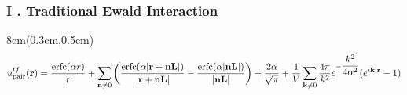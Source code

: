 \documentclass{beamer}
\begin{document}
	\begin{frame}
		\frametitle{I . Traditional Ewald Interaction }
		\footnotesize 
		
		\begin{textblock*}{8cm}(0.3cm,0.5cm)  
			\begin{equation*}
				u_{\text{pair}}^{tf}(\mathbf{r}) = \dfrac{\mathrm{erfc}(\alpha r)}{r} + \sum_{\mathbf{n}\ne 0} \bigg{(}\dfrac{\mathrm{erfc}(  \alpha|\mathbf{r}+\mathbf{n}\mathbf{L}|)}{|\mathbf{r}+\mathbf{n}\mathbf{L}|} - \dfrac{\mathrm{erfc}(  \alpha|\mathbf{n}\mathbf{L}|)}{|\mathbf{n}\mathbf{L}|}\bigg{)} + \dfrac{2\alpha}{\sqrt{\pi}} 
				+\dfrac{1}{V} \sum_{\mathbf{k}\ne 0} \dfrac{4\pi}{k^2} e^{-\dfrac{k^2}{4\alpha^2}}(e^{i\mathbf{k}\cdot \mathbf{r}} - 1) 
			\end{equation*}
		\end{textblock*}
		

\end{frame}
\end{document}
